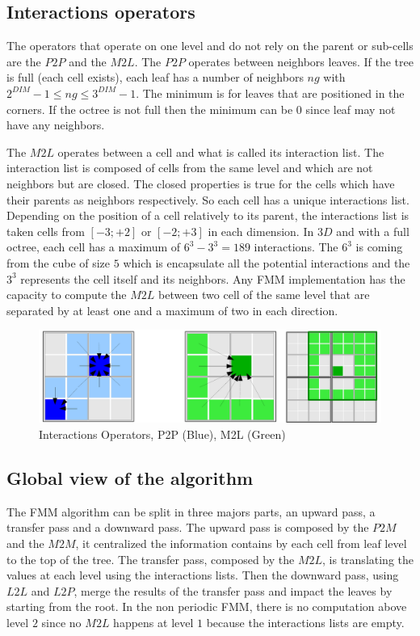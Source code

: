 \documentclass[12pt]{article} %
\begin{document}
\subsection{Interactions operators}
The operators that operate on one level and do not rely on the parent or sub-cells are the $P2P$ and the $M2L$.
The $P2P$ operates between neighbors leaves. If the tree is full (each cell exists), each leaf has a number of neighbors $ng$ with
$2^{DIM} - 1 \leq ng \leq 3^{DIM}-1$.
The minimum is for leaves that are positioned in the corners.
If the octree is not full then the minimum can be $0$ since leaf may not have any neighbors.

The $M2L$ operates between a cell and what is called its interaction list.
The interaction list is composed of cells from the same level and which are not neighbors but are closed.
The closed properties is true for the cells which have their parents as neighbors respectively.
So each cell has a unique interactions list.
Depending on the position of a cell relatively to its parent, the interactions list is taken cells from $[-3;+2]$ or $[-2;+3]$ in each dimension.
In $3D$ and with a full octree, each cell has a maximum of $6^3-3^3 = 189$ interactions.
The $6^3$ is coming from the cube of size $5$ which is encapsulate all the potential interactions and the $3^3$ represents the cell itself and its neighbors.
Any FMM implementation has the capacity to compute the $M2L$ between two cell of the same level that are separated by at least one and a maximum of two in each direction.

\begin{figure}[h]
\centering
\includegraphics[scale=0.6]{../Images/InteractionsOperators}
\caption{Interactions Operators, P2P (Blue), M2L (Green)}
\end{figure}

\subsection{Global view of the algorithm}
The FMM algorithm can be split in three majors parts, an upward pass, a transfer pass and a downward pass.
The upward pass is composed by the $P2M$ and the $M2M$, it centralized the information contains by each cell from leaf level to the top of the tree.
The transfer pass, composed by the $M2L$, is translating the values at each level using the interactions lists.
Then the downward pass, using $L2L$ and $L2P$, merge the results of the transfer pass and impact the leaves by starting from the root.
In the non periodic FMM, there is no computation above level $2$ since no $M2L$ happens at level $1$ because the interactions lists are empty.
\end{document}
